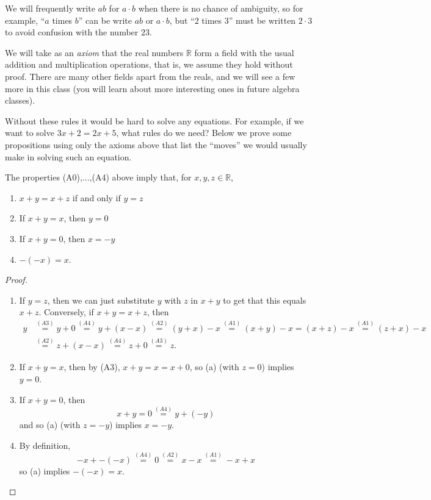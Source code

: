 \documentclass[11pt,dvipsnames]{book}
\numberwithin{figure}{section} %
\numberwithin{table}{section} %
\begin{document}
We will frequently write $ab$ for $a\cdot b$ when there is no chance of ambiguity, so for example, ``$a$ times $b$'' can be write $ab$ or $a\cdot b$, but ``$2$ times $3$'' must be written $2\cdot 3$ to avoid confusion with the number $23$.

We will take as an {\it axiom} that the real numbers $\mathbb{R}$ form a field with the usual addition and multiplication operations, that is, we assume they hold without proof.  There are many other fields apart from the reals, and we will see a few more in this class (you will learn about more interesting ones in future algebra classes).

Without these rules it would be hard to solve any equations. For example, if we want to solve $3x+2=2x+5$, what rules do we need? Below we prove some propositions using only the axioms above that list the ``moves'' we would usually make in solving such an equation.

\begin{proposition}
\label{p:field-consequences}
The properties (A0),...,(A4) above imply that, for $x,y,z\in \mathbb{R}$,
\begin{enumerate}[label=(\alph*)]
\item $x+y=x+z$ if and only if $y=z$
\item If $x+y=x$, then $y=0$
\item If $x+y=0$, then $x=-y$
\item $-(-x)=x$.
\end{enumerate}
\end{proposition}

\begin{proof}
\begin{enumerate}[label=(\alph*)]
\item If $y=z$, then we can just substitute $y$ with $z$ in $x+y$ to get that this equals $x+z$. Conversely, if $x+y=x+z$, then
\begin{align*}
y
& \stackrel{(A3)}{=}y+0\stackrel{(A4)}{=}y+(x-x)\stackrel{(A2)}{=}(y+x)-x\stackrel{(A1)}{=}(x+y)-x
=(x+z)-x\stackrel{(A1)}{=}(z+x)-x\\
&
\stackrel{(A2)}{=}z+(x-x)
\stackrel{(A4)}{=}z+0
\stackrel{(A3)}{=}z.
\end{align*}

\item If $x+y=x$, then by (A3), $x+y=x=x+0$, so (a) (with $z=0$) implies $y=0$.
\item If $x+y=0$, then
\[
x+y=0 \stackrel{(A4)}{=}y+(-y)
\]
and so (a) (with $z=-y$) implies $x=-y$.

\item By definition,
\[
-x+-(-x)\stackrel{(A4)}{=}
0\stackrel{(A2)}{=}x-x
\stackrel{(A1)}{=}-x+x
\]
so (a) implies $-(-x)=x$.
\end{enumerate}
\end{proof}
\end{document}
